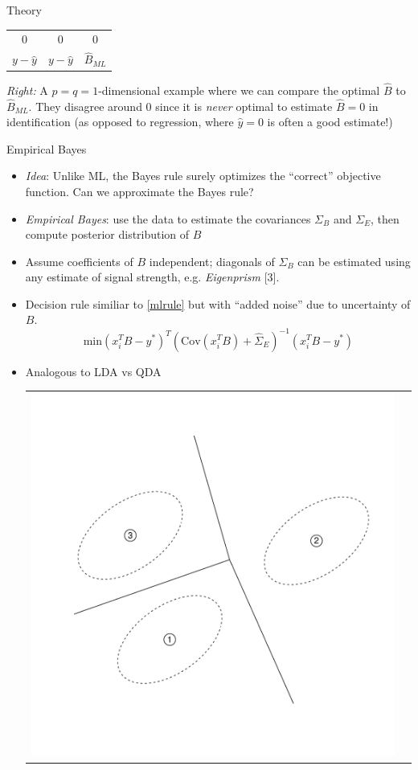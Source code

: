 \documentclass[final]{beamer}
\newlength{\onecolwid}
\begin{document}
\begin{frame}[t]
\begin{columns}[t]
\begin{column}{\onecolwid}
\begin{block}{Theory}
\begin{center}
\begin{tabular}{cc|c}
{\small 0} & {\small 0} & {\small 0}\\
{\small $ y - \hat{y}$} & {\small $y - \hat{y}$} & $\hat{B}_{ML}$
\end{tabular}
\end{center}
{\small
\emph{Right:} A $p = q = 1$-dimensional example where we can compare the optimal $\hat{B}$ to $\hat{B}_{ML}$.
They disagree around 0 since it is \emph{never} optimal to estimate $\hat{B}=0$ in identification (as opposed to regression, where $\hat{y} = 0$ is often a good estimate!)
}
\end{block}

\begin{block}{Empirical Bayes}

\begin{itemize}
\item \emph{Idea}: Unlike ML, the Bayes rule surely optimizes the ``correct'' objective function.  Can we approximate the Bayes rule?
\item \emph{Empirical Bayes}: use the data to estimate the covariances
$\Sigma_B$ and $\Sigma_E$, then compute posterior distribution of $B$
\item Assume coefficients of $B$ independent; diagonals of $\Sigma_B$ can be estimated using any estimate of signal strength, e.g. \emph{Eigenprism} [3].
\item Decision rule similiar to \eqref{mlrule} but with ``added noise'' due to uncertainty of $B$.
\[
\text{min} (x_i^T B - y^*)^T (\text{Cov}(x_i^T B) + \hat{\Sigma}_E)^{-1} (x_i^T B - y^*)
\]
\item Analogous to LDA vs QDA
\begin{center}
\begin{tabular}{cc}
\includegraphics[scale = 0.5, trim = 0in 1.5in 0in 0in]{illus1_A.pdf} & 

\end{tabular}
\end{center}
\end{itemize}
\end{block}
\end{column}
\end{columns}
\end{frame}
\end{document}
